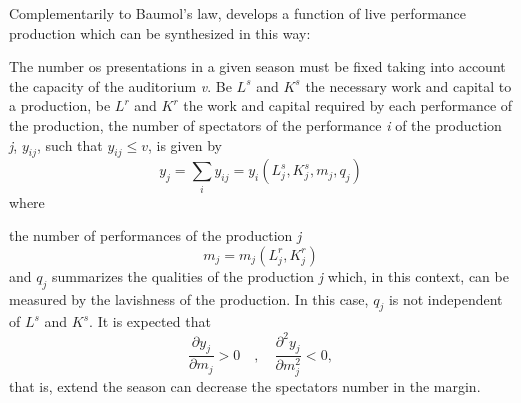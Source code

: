 \documentclass[a4paper, 12pt, openright, oneside, german, french, brazil, english]{abntex2}
\begin{document}
	Complementarily to Baumol's law,  develops a function of live performance production which can be synthesized in this way:
	
	
	The number os presentations in a given season must be fixed taking into account the capacity of the auditorium \textit{v}. Be $L^s$ and $K^s$ the necessary work and capital to a production, be $L^r$ and $K^r$ the work and capital required by each performance of the production, the number of spectators of the performance \textit{i} of the production \textit{j}, $y_{ij}$, such that $y_{ij} \leq v$, is given by
	$$y_j = \sum_iy_{ij} = y_i(L^{s}_{j}, K^{s}_{j}, m_j, q_j) $$ where
	
	the number of performances of the production \textit{j} $$m_j = m_j(L^{r}_{j}, K^{r}_{j})$$ and $q_j$ summarizes the qualities of the production \textit{j} which, in this context, can be measured by the lavishness of the production. In this case, $q_j$ is not independent of $L^s$ and $K^s$. It is expected that $$\frac{\partial y_j}{\partial m_j} > 0 \quad, \quad \frac{\partial^2y_j}{\partial m^{2}_{j}} < 0,$$ that is, extend the season can decrease the spectators number in the margin.
	
\end{document}
